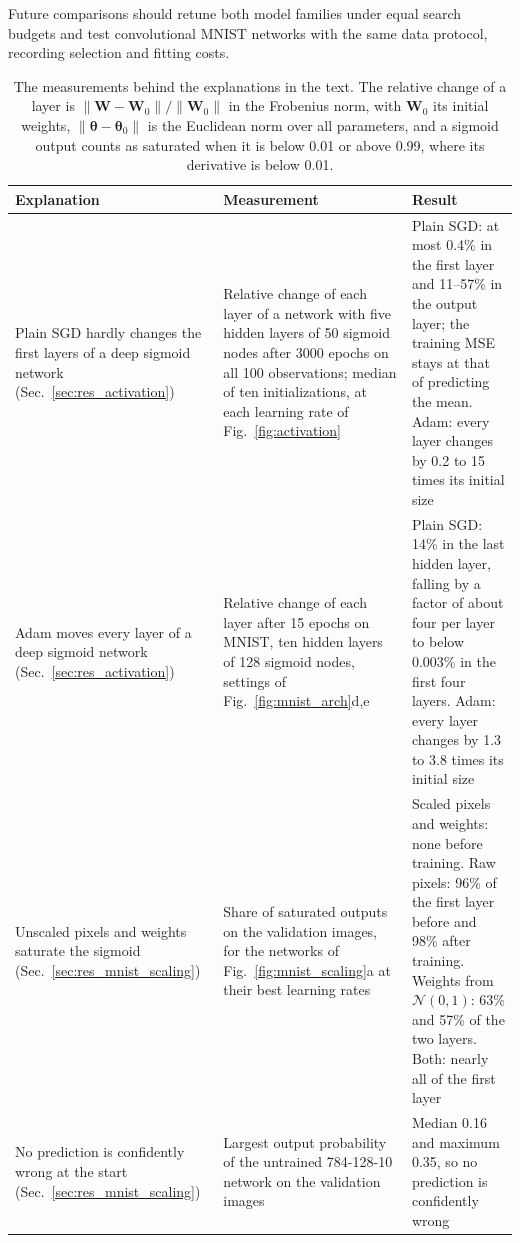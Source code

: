 \documentclass[aps,prb,reprint,superscriptaddress,nofootinbib,longbibliography,floatfix]{revtex4-2}
\begin{document}
Future comparisons should retune both model families under equal search budgets and test convolutional MNIST networks with the same data protocol, recording selection and fitting costs.

\clearpage
\appendix

\begin{table}[tb]
\caption{The measurements behind the explanations in the text. The relative change of a layer is $\|\bm W-\bm W_0\|/\|\bm W_0\|$ in the Frobenius norm, with $\bm W_0$ its initial weights, $\|\bm\theta-\bm\theta_0\|$ is the Euclidean norm over all parameters, and a sigmoid output counts as saturated when it is below 0.01 or above 0.99, where its derivative is below 0.01.}\label{tab:measurements}
\renewcommand{\arraystretch}{1.15}
\begin{ruledtabular}
\begin{tabular}{p{}p{}p{}}
Explanation & Measurement & Result \\ \hline
Plain SGD hardly changes the first layers of a deep sigmoid network (Sec.~\ref{sec:res_activation}) & Relative change of each layer of a network with five hidden layers of 50 sigmoid nodes after 3000 epochs on all 100 observations; median of ten initializations, at each learning rate of Fig.~\ref{fig:activation} & Plain SGD: at most 0.4\% in the first layer and 11--57\% in the output layer; the training MSE stays at that of predicting the mean. Adam: every layer changes by 0.2 to 15 times its initial size \\
Adam moves every layer of a deep sigmoid network (Sec.~\ref{sec:res_activation}) & Relative change of each layer after 15 epochs on MNIST, ten hidden layers of 128 sigmoid nodes, settings of Fig.~\ref{fig:mnist_arch}d,e & Plain SGD: 14\% in the last hidden layer, falling by a factor of about four per layer to below 0.003\% in the first four layers. Adam: every layer changes by 1.3 to 3.8 times its initial size \\
Unscaled pixels and weights saturate the sigmoid (Sec.~\ref{sec:res_mnist_scaling}) & Share of saturated outputs on the validation images, for the networks of Fig.~\ref{fig:mnist_scaling}a at their best learning rates & Scaled pixels and weights: none before training. Raw pixels: 96\% of the first layer before and 98\% after training. Weights from $\mathcal N(0,1)$: 63\% and 57\% of the two layers. Both: nearly all of the first layer \\
No prediction is confidently wrong at the start (Sec.~\ref{sec:res_mnist_scaling}) & Largest output probability of the untrained 784-128-10 network on the validation images & Median 0.16 and maximum 0.35, so no prediction is confidently wrong \\

\end{tabular}
\end{ruledtabular}
\end{table}
\end{document}
